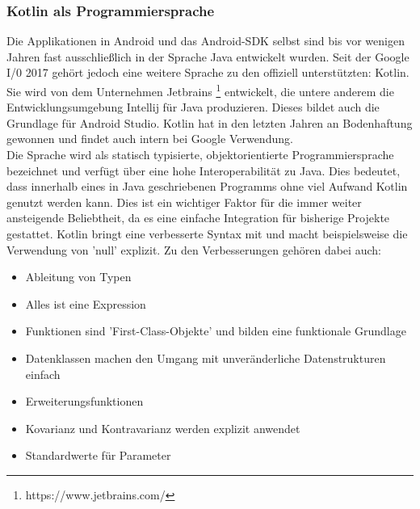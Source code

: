\subsubsection{Kotlin als Programmiersprache}
Die Applikationen in Android und das Android-SDK selbst sind bis vor wenigen Jahren fast ausschließlich in der Sprache Java entwickelt wurden. Seit der Google I/0 2017 gehört jedoch eine weitere Sprache zu den offiziell unterstützten:  Kotlin. Sie wird von dem Unternehmen Jetbrains
\footnote{https://www.jetbrains.com/}
entwickelt, die untere anderem die Entwicklungsumgebung Intellij für Java produzieren. Dieses bildet auch die Grundlage für Android Studio.
Kotlin hat in den letzten Jahren an Bodenhaftung gewonnen und findet auch intern bei Google Verwendung.
\\
Die Sprache wird als statisch typisierte, objektorientierte Programmiersprache bezeichnet und verfügt über eine hohe Interoperabilität zu Java. Dies bedeutet, dass innerhalb eines in Java geschriebenen Programms ohne viel Aufwand Kotlin genutzt werden kann. Dies ist ein wichtiger Faktor für die immer weiter ansteigende Beliebtheit, da es eine einfache Integration für bisherige Projekte gestattet. 
Kotlin bringt eine verbesserte Syntax mit und macht beispielsweise die Verwendung von 'null' explizit.
Zu den Verbesserungen gehören dabei auch:
\\
\begin{itemize}
	\item Ableitung von Typen
	\item Alles ist eine Expression 
	\item Funktionen sind 'First-Class-Objekte' und bilden eine funktionale Grundlage
	\item Datenklassen machen den Umgang mit unveränderliche Datenstrukturen einfach
	\item Erweiterungsfunktionen
	\item Kovarianz und Kontravarianz werden explizit anwendet
	\item Standardwerte für Parameter
\end{itemize}
\bigskip
